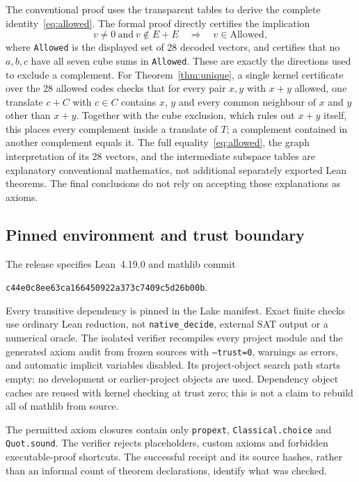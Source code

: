 \documentclass[11pt]{article}
\theoremstyle{definition}\newtheorem{definition}[theorem]{Definition}
\theoremstyle{remark}\newtheorem{remark}[theorem]{Remark}
\newcommand{\code}[1]{\texttt{\small #1}}
\begin{document}
The conventional proof uses the transparent tables to derive the complete identity~\eqref{eq:allowed}. The formal proof directly certifies the implication
\begin{equation}\label{eq:formalcover}
v\ne0\ \text{and}\ v\notin E+E\quad\Longrightarrow\quad v\in\mathrm{Allowed},
\end{equation}
where \code{Allowed} is the displayed set of 28 decoded vectors, and certifies that no $a,b,c$ have all seven cube sums in \code{Allowed}. These are exactly the directions used to exclude a complement. For Theorem~\ref{thm:unique}, a single kernel certificate over the 28 allowed codes checks that for every pair $x,y$ with $x+y$ allowed, one translate $c+C$ with $c\in C$ contains $x$, $y$ and every common neighbour of $x$ and $y$ other than $x+y$. Together with the cube exclusion, which rules out $x+y$ itself, this places every complement inside a translate of $T$; a complement contained in another complement equals it. The full equality~\eqref{eq:allowed}, the graph interpretation of its 28 vectors, and the intermediate subspace tables are explanatory conventional mathematics, not additional separately exported Lean theorems. The final conclusions do not rely on accepting those explanations as axioms.

\subsection{Pinned environment and trust boundary}

The release specifies Lean~4.19.0 and mathlib commit
\begin{center}
\small\nolinkurl{c44e0c8ee63ca166450922a373c7409c5d26b00b}.
\end{center}
Every transitive dependency is pinned in the Lake manifest. Exact finite checks use ordinary Lean reduction, not \code{native\_decide}, external SAT output or a numerical oracle. The isolated verifier recompiles every project module and the generated axiom audit from frozen sources with \code{--trust=0}, warnings as errors, and automatic implicit variables disabled. Its project-object search path starts empty; no development or earlier-project objects are used. Dependency object caches are reused with kernel checking at trust zero; this is not a claim to rebuild all of mathlib from source.

The permitted axiom closures contain only \code{propext}, \code{Classical.choice} and \code{Quot.sound}. The verifier rejects placeholders, custom axioms and forbidden executable-proof shortcuts. The successful receipt and its source hashes, rather than an informal count of theorem declarations, identify what was checked.
\end{document}
